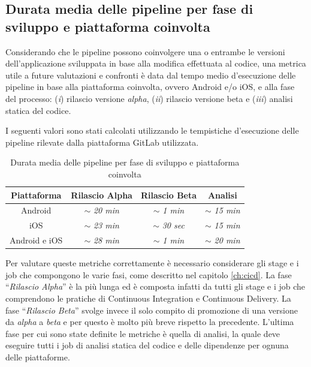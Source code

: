 \subsection*{Durata media delle pipeline per fase di sviluppo e piattaforma coinvolta}
Considerando che le pipeline possono coinvolgere una o entrambe le versioni dell'applicazione sviluppata in base alla modifica effettuata al codice, 
una metrica utile a future valutazioni e confronti è data dal tempo medio d'esecuzione delle pipeline in base alla piattaforma coinvolta, 
ovvero Android e/o iOS, 
e alla fase del processo: 
(\textit{i}) rilascio versione \textit{alpha}, 
(\textit{ii}) rilascio versione beta e (\textit{iii}) analisi statica del codice.

I seguenti valori sono stati calcolati utilizzando le tempistiche d'esecuzione delle pipeline rilevate dalla piattaforma GitLab utilizzata.

\begin{table}[H]
\centering
    \begin{tabular}{|c|c|c|c|}
         \hline
         \textbf{Piattaforma} & \textbf{Rilascio Alpha} & \textbf{Rilascio Beta} & \textbf{Analisi}\\
         \hline
         Android & $\sim$ \textit{20 min} & $\sim$ \textit{1 min} & $\sim$ \textit{15 min} \\
         \hline
         iOS & $\sim$ \textit{23 min} & $\sim$ \textit{30 sec} & $\sim$ \textit{15 min} \\
         \hline
         Android e iOS & $\sim$ \textit{28 min} & $\sim$ \textit{1 min} & $\sim$ \textit{20 min} \\
         \hline
    \end{tabular}
    \caption{Durata media delle pipeline per fase di sviluppo e piattaforma coinvolta}
\end{table}

Per valutare queste metriche correttamente è necessario considerare gli stage e i job che compongono le varie fasi, 
come descritto nel capitolo \ref{ch:cicd}. 
La fase ``\textit{Rilascio Alpha}'' è la più lunga ed è composta infatti da tutti gli stage e i job che comprendono le pratiche di Continuous Integration e Continuous Delivery. 
La fase ``\textit{Rilascio Beta}'' svolge invece il solo compito di promozione di una versione da \textit{alpha} a \textit{beta} e per questo è molto più breve rispetto la precedente. 
L'ultima fase per cui sono state definite le metriche è quella di analisi, 
la quale deve eseguire tutti i job di analisi statica del codice e delle dipendenze per ognuna delle piattaforme.


